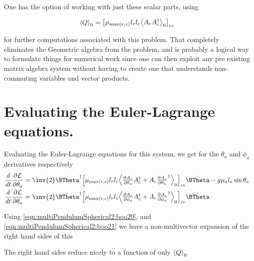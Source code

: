 One has the option of working with just these scalar parts, using 

\begin{align}\label{eqn:multiPendulumSpherical2:boo21}
{\left\langle{{Q}}\right\rangle}_{0} = 
{\begin{bmatrix}
\mu_{\max(r,c)} l_r l_c {\left\langle{{ A_r A_c^\dagger }}\right\rangle}_{0}
\end{bmatrix}}_{rc}
\end{align}

for further computations associated with this problem.  That completely eliminates the Geometric algebra from the problem, and is probably a logical way to formulate things for numerical work since one can then exploit any pre existing matrix algebra system without having to create one that understands non-commuting variables and vector products.

\section{Evaluating the Euler-Lagrange equations.}

Evaluating the Euler-Lagrange equations for this system, we get for the $\theta_a$ and $\phi_a$ derivatives respectively
\begin{align}\label{eqn:multiPendulumSpherical2:boo6}
\frac{d}{dt} \PD{\theta_a}{\LL}
&=
\inv{2} \dot{\BTheta}^\dagger
{\begin{bmatrix}
\mu_{\max(r,c)} l_r l_c \gpgradezero{
\PD{\theta_a}{A_r} A_c^\dagger
+A_r \PD{\theta_a}{A_c}^\dagger
}
\end{bmatrix}}_{rc} 
\dot{\BTheta}
-g \mu_a l_a \sin\theta_a \\
\frac{d}{dt} \PD{\theta_a}{\LL}
&=
\inv{2} \dot{\BTheta}^\dagger
{\begin{bmatrix}
\mu_{\max(r,c)} l_r l_c \gpgradezero{
\PD{\phi_a}{A_r} A_c^\dagger
+A_r \PD{\phi_a}{A_c}^\dagger
}
\end{bmatrix}}_{rc} 
\dot{\BTheta}
\end{align}

Using \ref{eqn:multiPendulumSpherical2:boo20}, and \ref{eqn:multiPendulumSpherical2:boo21} we have a non-multivector expansion of the right hand sides of this

The right hand sides reduce nicely to a function of only ${\left\langle{{Q}}\right\rangle}_{0}$

